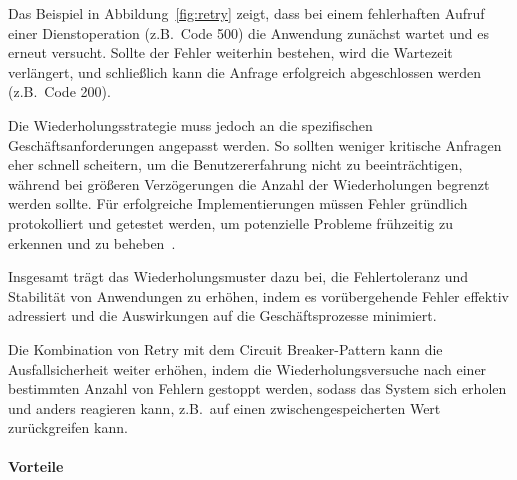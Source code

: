 Das Beispiel in Abbildung~\ref{fig:retry} zeigt, dass bei einem fehlerhaften Aufruf einer Dienstoperation
(z.B.\ Code 500) die Anwendung zunächst wartet und es erneut versucht.
Sollte der Fehler weiterhin bestehen, wird die Wartezeit verlängert, und schließlich
kann die Anfrage erfolgreich abgeschlossen werden (z.B.\ Code 200).

Die Wiederholungsstrategie muss jedoch an die spezifischen Geschäftsanforderungen angepasst werden.
So sollten weniger kritische Anfragen eher schnell scheitern, um die Benutzererfahrung nicht zu beeinträchtigen,
während bei größeren Verzögerungen die Anzahl der Wiederholungen begrenzt werden sollte.
Für erfolgreiche Implementierungen müssen Fehler gründlich protokolliert und getestet werden,
um potenzielle Probleme frühzeitig zu erkennen und zu beheben~\cite{Meheden.2021}.

Insgesamt trägt das Wiederholungsmuster dazu bei, die Fehlertoleranz und Stabilität von Anwendungen zu erhöhen,
indem es vorübergehende Fehler effektiv adressiert und die Auswirkungen auf die Geschäftsprozesse minimiert.

Die Kombination von Retry mit dem Circuit Breaker-Pattern kann die Ausfallsicherheit weiter erhöhen,
indem die Wiederholungsversuche nach einer bestimmten Anzahl von Fehlern gestoppt werden,
sodass das System sich erholen und anders reagieren kann, z.B.\ auf einen zwischengespeicherten Wert zurückgreifen kann.

\paragraph{Vorteile}

